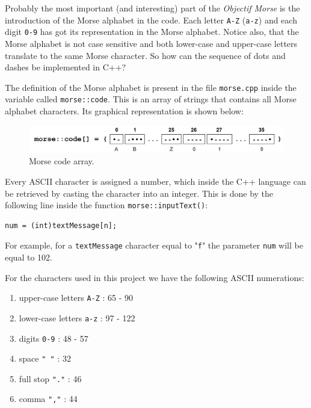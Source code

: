 \documentclass[12pt]{report}
\begin{document}
Probably the most important (and interesting) part of the \textit{Objectif Morse} is the introduction of the Morse alphabet in the code. Each letter \verb|A-Z| (\verb|a-z|) and each digit \verb|0-9| has got its representation in the Morse alphabet. Notice also, that the Morse alphabet is not case sensitive and both lower-case and upper-case letters translate to the same Morse character. So how can the sequence of dots and dashes be implemented in C++?

The definition of the Morse alphabet is present in the file \verb|morse.cpp| inside the variable called \verb|morse::code|. This is an array of strings that contains all Morse alphabet characters. Its graphical representation is shown below:

\begin{figure}[H]
\centering\includegraphics[scale=0.1]{morse--code}
\caption{Morse code array.}				
\label{fig:morse_code_array}
\end{figure}

Every ASCII character is assigned a number, which inside the C++ language can be retrieved by casting the character into an integer. This is done by the following line inside the function \verb|morse::inputText()|: 

\begin{lstlisting}
num = (int)textMessage[n];
\end{lstlisting}

For example, for a \verb|textMessage| character equal to "\verb|f|" the parameter \verb|num| will be equal to 102.

For the characters used in this project we have the following ASCII numerations:

\begin{enumerate}

\item upper-case letters \verb|A-Z| : 65 - 90

\item lower-case letters \verb|a-z| : 97 - 122

\item digits \verb|0-9| : 48 - 57

\item space \verb|" "| : 32

\item full stop \verb|"."| : 46

\item comma \verb|","| : 44

\end{enumerate}
\end{document}
